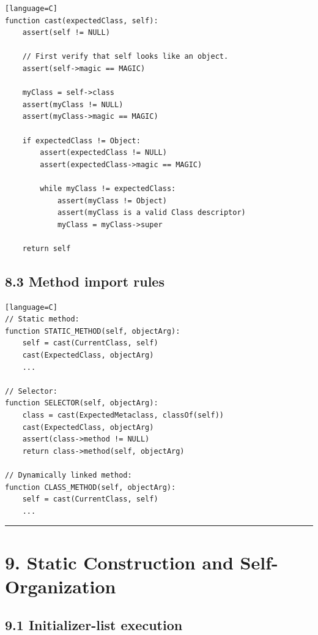 \documentclass[11pt]{article}
\begin{document}
\begin{verbatim}[language=C]
function cast(expectedClass, self):
    assert(self != NULL)

    // First verify that self looks like an object.
    assert(self->magic == MAGIC)

    myClass = self->class
    assert(myClass != NULL)
    assert(myClass->magic == MAGIC)

    if expectedClass != Object:
        assert(expectedClass != NULL)
        assert(expectedClass->magic == MAGIC)

        while myClass != expectedClass:
            assert(myClass != Object)
            assert(myClass is a valid Class descriptor)
            myClass = myClass->super

    return self
\end{verbatim}

\subsection{8.3 Method import rules}\label{method-import-rules}

\begin{verbatim}[language=C]
// Static method:
function STATIC_METHOD(self, objectArg):
    self = cast(CurrentClass, self)
    cast(ExpectedClass, objectArg)
    ...

// Selector:
function SELECTOR(self, objectArg):
    class = cast(ExpectedMetaclass, classOf(self))
    cast(ExpectedClass, objectArg)
    assert(class->method != NULL)
    return class->method(self, objectArg)

// Dynamically linked method:
function CLASS_METHOD(self, objectArg):
    self = cast(CurrentClass, self)
    ...
\end{verbatim}

\begin{center}\rule{0.5\linewidth}{0.5pt}\end{center}

\section{9. Static Construction and
Self-Organization}\label{static-construction-and-self-organization}

\subsection{9.1 Initializer-list
execution}\label{initializer-list-execution}
\end{document}
